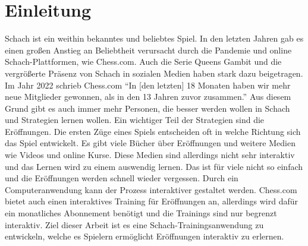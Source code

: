 
\chapter{Einleitung}

Schach ist ein weithin bekanntes und beliebtes Spiel. In den letzten Jahren gab es einen großen Anstieg an Beliebtheit verursacht durch die Pandemie und online Schach-Plattformen, wie Chess.com. Auch die Serie Queens Gambit und die vergrößerte Präsenz von Schach in sozialen Medien haben stark dazu beigetragen. Im Jahr 2022 schrieb Chess.com\: \enquote{In [den letzten] 18 Monaten haben wir mehr neue Mitglieder gewonnen, als in den 13 Jahren zuvor zusammen.} \cite{chesscom_chesscom_2022} Aus diesem Grund gibt es auch immer mehr Personen, die besser werden wollen in Schach und Strategien lernen wollen. Ein wichtiger Teil der Strategien sind die Eröffnungen. Die ersten Züge eines Spiels entscheiden oft in welche Richtung sich das Spiel entwickelt. Es gibt viele Bücher über Eröffnungen und weitere Medien wie Videos und online Kurse. Diese Medien sind allerdings nicht sehr interaktiv und das Lernen wird zu einem auswendig lernen. Das ist für viele nicht so einfach und die Eröffnungen werden schnell wieder vergessen. Durch ein Computeranwendung kann der Prozess interaktiver gestaltet werden. Chess.com bietet auch einen interaktives Training für Eröffnungen an, allerdings wird dafür ein monatliches Abonnement benötigt und die Trainings sind nur begrenzt interaktiv. Ziel dieser Arbeit ist es eine Schach-Trainingsanwendung zu entwickeln, welche es Spielern ermöglicht Eröffnungen interaktiv zu erlernen. 

